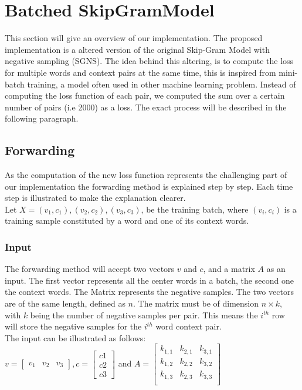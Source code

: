 \section{Batched SkipGramModel} \label{sec:contribution}
This section will give an overview of our implementation. The proposed implementation is a altered version of the original Skip-Gram Model with negative sampling (SGNS). The idea behind this altering, is to compute the loss for multiple words and context pairs at the same time, this is inspired from mini-batch training, a model often used in other machine learning problem. Instead of computing the loss function of each pair, we computed the sum over a certain number of pairs (i.e 2000) as a loss. The exact process will be described in the following paragraph.
\subsection{Forwarding}
As the computation of the new loss function represents the challenging part of our implementation the forwarding method is explained step by step. Each time step is illustrated to make the explanation clearer.\\
Let $X = {(v_1,c_1),(v_2,c_2),(v_3,c_3)}$, be the training batch, where $(v_i,c_i)$ is a training sample constituted by a word and one of its context words. 
\subsubsection{Input}
The forwarding method will accept two vectors $v$ and $c$, and a matrix $A$ as an input. The first vector represents all the center words in a batch, the second one the context words. The Matrix represents the negative samples. The two vectors are of the same length, defined as $n$. The matrix must be of dimension $n \times k$, with $k$ being the number of negative samples per pair. This means the $i^{th}$ row will store the negative samples for the $i^{th}$ word context pair.\\
The input can be illustrated as follows: \\
$v = \begin{bmatrix}
v_1 & v_2 & v_3
\end{bmatrix}, c = \begin{bmatrix}
c1\\
c2\\
c3\end{bmatrix}$ and $A =
\begin{bmatrix}
k_{1,1} & k_{2,1} & k_{3,1}\\
k_{1,2} & k_{2,2} & k_{3,2}\\
k_{1,3} & k_{2,3} & k_{3,3}\\
\end{bmatrix}$\\

